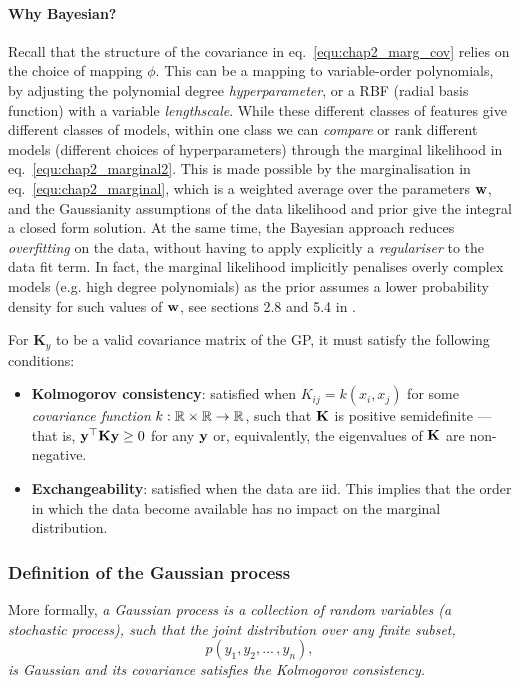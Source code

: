 	\paragraph{Why Bayesian?} Recall that the structure of the covariance in eq.~\eqref{equ:chap2_marg_cov} relies
	on the choice of mapping $\phi$. This can be a mapping to variable-order
	polynomials, by adjusting the polynomial degree \textit{hyperparameter}, or a RBF
	(radial basis function) with a variable \textit{lengthscale}. While these different classes of
	features give different classes of models, within one class we can \textit{compare} or rank different models
	(different choices of hyperparameters) through the marginal likelihood in eq.~\eqref{equ:chap2_marginal2}.
	This is made possible by the marginalisation in eq.~\eqref{equ:chap2_marginal},
	which is a weighted average over the parameters $\mathbf{w}$, and the Gaussianity assumptions of the data
	likelihood and prior give the integral a closed form solution.
	At the same time, the Bayesian approach reduces \textit{overfitting} on the data, without
	having to apply explicitly a \textit{regulariser} to the data fit term. In fact,
	the marginal likelihood implicitly penalises overly complex models (e.g. high degree polynomials)
	as the prior assumes a lower probability density for such values of $\mathbf{w}$,
	see sections 2.8 and 5.4 in \citep[respectively]{Rasmussen:book06, MacKay:book03}.

	For $\mathbf{K}_y$ to be a valid covariance matrix of the GP, it must satisfy the following conditions:
	\begin{itemize}
	  \item \textbf{Kolmogorov consistency}: satisfied when
	  $K_{ij} = k(x_i, x_j)$ for some \textit{covariance function}
	  $k:\mathbb{R} \times \mathbb{R} \rightarrow \mathbb{R}$, such
	  that $\mathbf{K}$ is positive semidefinite --- that is,
	  $\mathbf{y}^\top\mathbf{K}\mathbf{y}\geq 0$ for any $\mathbf{y}$ or, equivalently, the eigenvalues of $\mathbf{K}$ are non-negative.
	  \item \textbf{Exchangeability}: satisfied when the data are iid.
	  This implies that the order in which the data become available has no impact on
	  the marginal distribution.
	\end{itemize}

      \subsubsection{Definition of the Gaussian process} \label{subsubsec:chap2_GPdef}
	More formally, \textit{ a Gaussian process is a collection of random variables
	(a stochastic process), such that the joint distribution over any finite subset,
	\begin{equation*}
	  p \left( y_1, y_2,...\,, y_n \right),
	\end{equation*}
	is Gaussian and its covariance satisfies the Kolmogorov consistency.}


